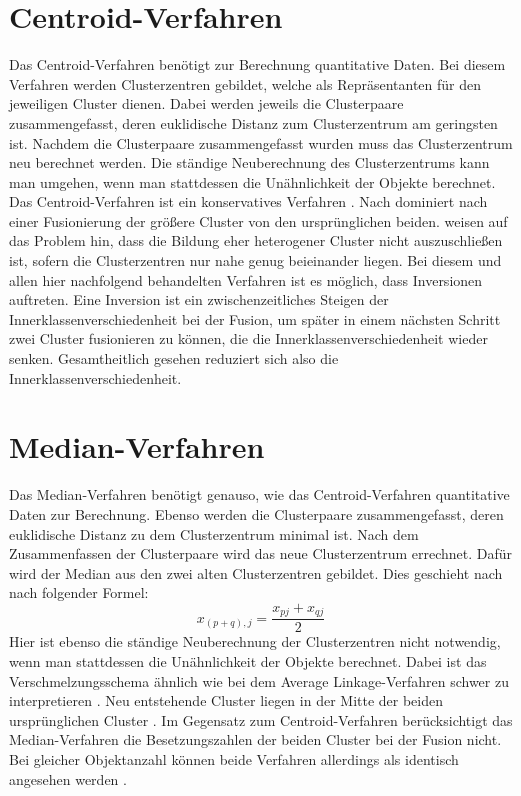 \section{Centroid-Verfahren}
Das Centroid-Verfahren benötigt zur Berechnung quantitative Daten. Bei diesem Verfahren werden Clusterzentren gebildet, welche als Repräsentanten für den jeweiligen Cluster dienen. Dabei werden jeweils die Clusterpaare zusammengefasst, deren euklidische Distanz zum Clusterzentrum am geringsten ist. Nachdem die Clusterpaare zusammengefasst wurden muss das Clusterzentrum neu berechnet werden. Die ständige Neuberechnung des Clusterzentrums kann man umgehen, wenn man stattdessen die Unähnlichkeit der Objekte berechnet. Das Centroid-Verfahren ist ein konservatives Verfahren \citep[Vgl.][S. 285-289]{Bacher.2010}. Nach \citet[S. 79]{Everitt.2011} dominiert nach einer Fusionierung der größere Cluster von den ursprünglichen beiden.
\citet[S. 243]{Eckey.2002} weisen auf das Problem hin, dass die Bildung eher heterogener Cluster nicht auszuschließen ist, sofern die Clusterzentren nur nahe genug beieinander liegen. Bei diesem und allen hier nachfolgend behandelten Verfahren ist es möglich, dass Inversionen auftreten. Eine Inversion ist ein zwischenzeitliches Steigen der Innerklassenverschiedenheit bei der Fusion, um später in einem nächsten Schritt zwei Cluster fusionieren zu können, die die Innerklassenverschiedenheit wieder senken. Gesamtheitlich gesehen reduziert sich also die Innerklassenverschiedenheit.

\section{Median-Verfahren}
Das Median-Verfahren benötigt genauso, wie das Centroid-Verfahren quantitative Daten zur Berechnung. Ebenso werden die Clusterpaare zusammengefasst, deren euklidische Distanz zu dem Clusterzentrum minimal ist. Nach dem Zusammenfassen der Clusterpaare wird das neue Clusterzentrum errechnet. Dafür wird der Median aus den zwei alten Clusterzentren gebildet. Dies geschieht nach \citet[S. 286]{Bacher.2010} nach folgender Formel:
\begin{equation}
	x_{(p+q),j} = \frac{x_{pj} + x_{qj}}{2}
\end{equation}
Hier ist ebenso die ständige Neuberechnung der Clusterzentren nicht notwendig, wenn man stattdessen die Unähnlichkeit der Objekte berechnet. Dabei ist das Verschmelzungsschema ähnlich wie bei dem Average Linkage-Verfahren schwer zu interpretieren \citep[Vgl.][S. 285-289]{Bacher.2010}. Neu entstehende Cluster liegen in der Mitte der beiden ursprünglichen Cluster \citep[Vgl.][S. 79]{Everitt.2011}.
Im Gegensatz zum Centroid-Verfahren berücksichtigt das Median-Verfahren die Besetzungszahlen der beiden Cluster bei der Fusion nicht. Bei gleicher Objektanzahl können beide Verfahren allerdings als identisch angesehen werden \citep[Vgl.][S. 242]{Eckey.2002}.

